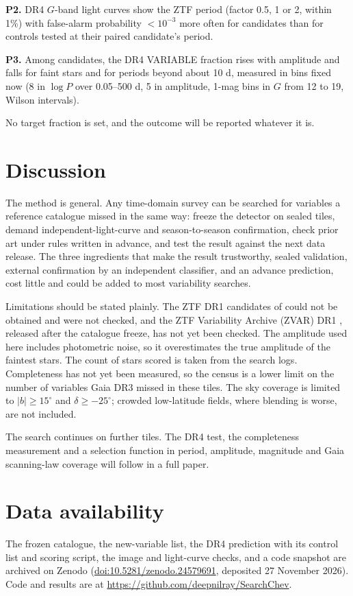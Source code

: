 \documentclass[twocolumn]{searchchev_preprint}
\begin{document}
\textbf{P2.} DR4 $G$-band light curves show the ZTF period (factor 0.5, 1 or 2, within 1\%) with false-alarm probability
$<10^{-3}$ more often for candidates than for controls tested at their paired candidate's period.

\textbf{P3.} Among candidates, the DR4 VARIABLE fraction rises with amplitude and falls for faint stars and for periods
beyond about 10 d, measured in bins fixed now (8 in $\log P$ over 0.05--500 d, 5 in amplitude, 1-mag bins in $G$ from 12
to 19, Wilson intervals).

No target fraction is set, and the outcome will be reported whatever it is.

\section{Discussion}
The method is general. Any time-domain survey can be searched for variables a reference catalogue missed in the same
way: freeze the detector on sealed tiles, demand independent-light-curve and season-to-season confirmation, check
prior art under rules written in advance, and test the result against the next data release. The three ingredients
that make the result trustworthy, sealed validation, external confirmation by an independent classifier, and an
advance prediction, cost little and could be added to most variability searches.

Limitations should be stated plainly. The ZTF DR1 candidates of \citet{Ofek2020} could not be obtained and were not
checked, and the ZTF Variability Archive (ZVAR) DR1 \citep{Graham2026}, released after the catalogue freeze, has not
yet been checked. The amplitude used here includes photometric noise, so it overestimates the true amplitude of the faintest
stars. The count of stars scored is taken from the search logs. Completeness has not yet been measured, so the
census is a lower limit on the number of variables Gaia DR3 missed in these tiles. The sky coverage is limited to
$|b|\ge15^\circ$ and $\delta\ge-25^\circ$; crowded low-latitude fields, where blending is worse, are not included.

The search continues on further tiles. The DR4 test, the completeness measurement and a selection function in
period, amplitude, magnitude and Gaia scanning-law coverage will follow in a full paper.

\section*{Data availability}
The frozen catalogue, the new-variable list, the DR4 prediction with its control list and scoring script, the image and
light-curve checks, and a code snapshot are archived on Zenodo (\href{https://doi.org/10.5281/zenodo.24579691}{doi:10.5281/zenodo.24579691}, deposited 27 November 2026). Code and
results are at \url{https://github.com/deepnilray/SearchChev}.
\end{document}
